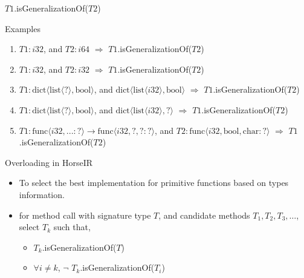 \documentclass{beamer}
\newcommand{\cmark}{\ding{51}}%
\newcommand{\xmark}{\ding{55}}%
\begin{document}
\begin{frame}[fragile]{$T1$.isGeneralizationOf($T2$)}
\begin{block}{Examples}
\begin{enumerate}
    \item $T1 : i32$, and $T2 : i64$ $\Rightarrow$ 
          $T1$.isGeneralizationOf($T2$) \xmark
    \item $T1 : i32$, and $T2 : i32$ $\Rightarrow$
          $T1$.isGeneralizationOf($T2$) \cmark
    \item $T1 : \text{dict}\langle \text{list}\langle ? \rangle, \text{bool}
          \rangle$, and $\text{dict}\langle \text{list}\langle i32 \rangle,
          \text{bool} \rangle$ $\Rightarrow$ $T1$.isGeneralizationOf($T2$)
          \cmark
    \item $T1 : \text{dict}\langle \text{list}\langle ? \rangle, \text{bool}
          \rangle$, and $\text{dict}\langle \text{list}\langle i32 \rangle,
          ? \rangle$ $\Rightarrow$ $T1$.isGeneralizationOf($T2$) \xmark
    \item $T1 : \text{func}\langle i32, ... : ?\rangle \rightarrow
                \text{func}\langle i32, ?, ? : ?\rangle$, and
          $T2 : \text{func}\langle i32, \text{bool}, \text{char} : ? \rangle$
          $\Rightarrow$ $T1$.isGeneralizationOf($T2$) \cmark
\end{enumerate}    
\end{block}
\end{frame}

\begin{frame}{Overloading in HorseIR}
\begin{itemize}
    \item To select the best implementation for primitive functions based on
          types information.
    \item for method call with signature type $T$, and candidate methods $T_1,
          T_2, T_3, \dots$, select $T_k$ such that,
          \begin{itemize}
          \item $T_k$.isGeneralizationOf($T$)
          \item $\forall i \neq k$, $\neg$ $T_k$.isGeneralizationOf($T_i$)
          \end{itemize}
\end{itemize}
\end{frame}
\end{document}
